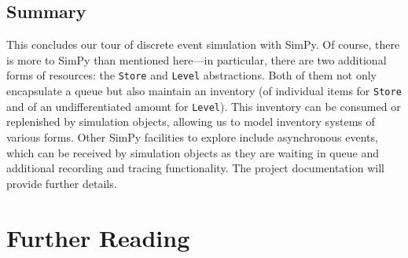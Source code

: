 
\vspace*{-6pt}
\subsection{Summary}

This concludes our tour of discrete event simulation with SimPy. Of
course, there is more to SimPy than mentioned here---in particular,\vadjust{\pagebreak}
there are two additional forms of resources: the \texttt{Store} and
\texttt{Level} abstractions. Both of them not only encapsulate a queue
but also maintain an inventory (of individual items for \texttt{Store}
and of an undifferentiated amount for \texttt{Level}). This inventory
can be consumed or replenished by simulation objects, allowing us to
model inventory systems of various forms. Other SimPy facilities to
explore include asynchronous events, which can be received by
simulation objects as they are waiting in queue and additional
recording and tracing functionality. The project documentation will
provide further details.


\section{Further Reading}

